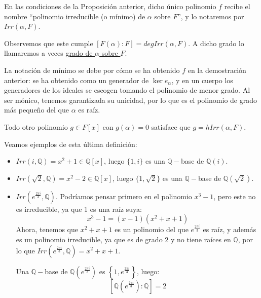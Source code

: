 
\begin{definicion}
    En las condiciones de la Proposición anterior, dicho único polinomio $f$ recibe el nombre ``polinomio irreducible (o mínimo) de $\alpha$ sobre $F$'', y lo notaremos por $Irr(\alpha,F)$.

    \noindent
    Observemos que este cumple $[F(\alpha):F] = deg Irr(\alpha,F)$. A dicho grado lo llamaremos a veces \underline{grado de $\alpha$ sobre $F$}.
\end{definicion}

\noindent
La notación de mínimo se debe por cómo se ha obtenido $f$ en la demostración anterior: se ha obtenido como un generador de $\ker e_\alpha$, y en un cuerpo los generadores de los ideales se escogen tomando el polinomio de menor grado. Al ser mónico, tenemos garantizada su unicidad, por lo que es el polinomio de grado más pequeño del que $\alpha$ es raíz.

\begin{observacion}
    Todo otro polinomio $g\in F[x]$ con $g(\alpha)=0$ satisface que $g = hIrr(\alpha,F)$.
\end{observacion}

\begin{ejemplo}
    Veamos ejemplos de esta última definición:
    \begin{itemize}
        \item $Irr(i,\mathbb{Q}) = x^2+1 \in \mathbb{Q}[x]$, luego $\{1,i\}$ es una $\mathbb{Q}-$base de $\mathbb{Q}(i)$.
        \item $Irr(\sqrt{2}, \mathbb{Q}) = x^2-2 \in \mathbb{Q}[x]$, luego $\{1,\sqrt{2}\}$ es una $\mathbb{Q}-$base de $\mathbb{Q}(\sqrt{2})$.
        \item $Irr\left(e^{\frac{2\pi i}{3}}, \mathbb{Q}\right)$. Podríamos pensar primero en el polinomio $x^3-1$, pero este no es irreducible, ya que 1 es una raíz suya:
            \begin{equation*}
                x^3-1 = (x-1)\left(x^2+x+1\right)
            \end{equation*}
            Ahora, tenemos que $x^2+x+1$ es un polinomio del que $e^{\frac{2\pi i}{3}}$ es raíz, y además es un polinomio irreducible, ya que es de grado 2 y no tiene raíces en $\mathbb{Q}$, por lo que $Irr\left(e^{\frac{2\pi i}{3}}, \mathbb{Q}\right) = x^2+x+1$.

            Una $\mathbb{Q}-$base de $\mathbb{Q}\left(e^{\frac{2\pi i}{3}}\right)$ es $\left\{1,e^{\frac{2\pi i}{3}}\right\}$, luego:
            \begin{equation*}
                \left[\mathbb{Q}\left(e^{\frac{2\pi i}{3}}\right):\mathbb{Q}\right] = 2
            \end{equation*}
    \end{itemize}
\end{ejemplo}

